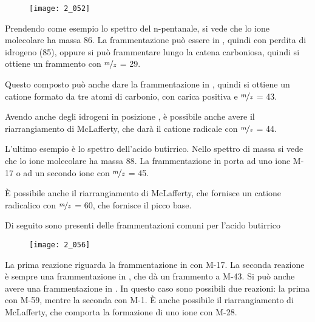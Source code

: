 \begin{figure}[H]
  \texttt{[image: 2\_052]}
\end{figure}

Prendendo come esempio lo spettro del n-pentanale, si vede che lo ione
molecolare ha massa 86. La frammentazione può essere in \alpha, quindi
con perdita di idrogeno (85), oppure si può frammentare lungo la catena
carboniosa, quindi si ottiene un frammento con $\nicefrac{m}{z}$ = 29.

Questo composto può anche dare la frammentazione in \beta, quindi si
ottiene un catione formato da tre atomi di carbonio, con carica positiva
e $\nicefrac{m}{z}$ = 43.

Avendo anche degli idrogeni in posizione \gamma, è possibile anche avere
il riarrangiamento di McLafferty, che darà il catione radicale con $\nicefrac{m}{z}$ =
44.


L'ultimo esempio è lo spettro dell'acido butirrico. Nello spettro di
massa si vede che lo ione molecolare ha massa 88. La frammentazione in
\alpha porta ad uno ione M-17 o ad un secondo ione con $\nicefrac{m}{z}$ = 45.

È possibile anche il riarrangiamento di McLafferty, che fornisce un
catione radicalico con $\nicefrac{m}{z}$ = 60, che fornisce il picco base.


\vfill
\pagebreak


Di seguito sono presenti delle frammentazioni comuni per l'acido
butirrico

\begin{figure}[H]
  \texttt{[image: 2\_056]}
\end{figure}

La prima reazione riguarda la frammentazione in \alpha{} con M-17. La
seconda reazione è sempre una frammentazione in \alpha, che dà un
frammento a M-43. Si può anche avere una frammentazione in \beta. In
questo caso sono possibili due reazioni: la prima con M-59, mentre la
seconda con M-1. È anche possibile il riarrangiamento di McLafferty, che
comporta la formazione di uno ione con M-28.
